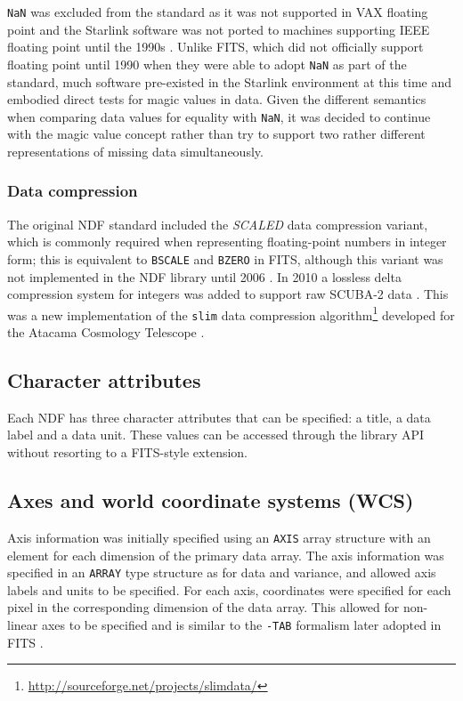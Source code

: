 \documentclass[final,authoryear,5p,times,twocolumn]{elsarticle}
\begin{document}
\texttt{NaN} was excluded from the standard as it was not
supported in VAX floating point \citep[see e.g.][]{660194} and the Starlink
software was not ported to machines supporting IEEE floating point
until the 1990s \citep[e.g.,][]{1991STARB...8...11C}. Unlike FITS, which
did not officially support floating point until 1990
\citep{1989FPFITS,1991BAAS...23..993S} when they were able to adopt
\texttt{NaN} as part of the standard, much software pre-existed
in the Starlink environment at this time and embodied
direct tests for magic values in data. Given the different semantics
when comparing data values for equality with \texttt{NaN}, it was decided to
continue with the magic value concept rather than try to support two
rather different representations of missing data simultaneously.

\subsubsection{Data compression}

The original NDF standard included the \emph{SCALED} data compression
variant, which is commonly required when representing floating-point numbers in
integer form; this is equivalent to \texttt{BSCALE} and \texttt{BZERO} in
FITS, although this variant was not implemented in the NDF library
until 2006 \citep{2008ASPC..394..650C}. In 2010 a lossless delta
compression system for integers was added to support raw SCUBA-2 data
\citep{2013MNRAS.430.2513H}. This was a new implementation of the
\texttt{slim} data compression
algorithm\footnote{\url{http://sourceforge.net/projects/slimdata/}}
developed for the Atacama Cosmology Telescope
\citep{2004SPIE.5498....1F}.

\subsection{Character attributes}

Each NDF has three character attributes that can be specified: a
title, a data label and a data unit. These values can be accessed
through the library API without resorting to a FITS-style extension.

\subsection{Axes and world coordinate systems (WCS)}
\label{sec:wcs}

Axis information was initially specified using an \texttt{AXIS} array
structure with an element for each dimension of the primary data
array. The axis information was specified in an \texttt{ARRAY} type
structure as for data and variance, and allowed axis labels and units
to be specified. For each axis, coordinates were specified for each
pixel in the corresponding dimension of the data array. This allowed
for non-linear axes to be specified and is similar to the
\texttt{-TAB} formalism later adopted in FITS \citep{2006A&A...446..747G}.
\end{document}
